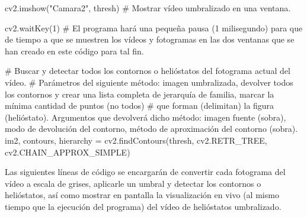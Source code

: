 \documentclass[12pt]{article}
\begin{document}
    cv2.imshow("Camara2", thresh) \# Mostrar vídeo umbralizado en una ventana.

    cv2.waitKey(1) \# El programa hará una pequeña pausa (1 milisegundo) para que de tiempo a que se muestren los vídeos y fotogramas en las dos ventanas que se han creado en este código para tal fin.

    \# Buscar y detectar todos los contornos o helióstatos del fotograma actual del vídeo.
    \# Parámetros del siguiente método: imagen umbralizada, devolver todos los contornos y crear una lista completa de jerarquía de familia, marcar la mínima cantidad de puntos (no todos)
    \# que forman (delimitan) la figura (helióstato). Argumentos que devolverá dicho método: imagen fuente (sobra), modo de devolución del contorno, método de aproximación del contorno (sobra).
    im2, contours, hierarchy = cv2.findContours(thresh, cv2.RETR\_TREE, cv2.CHAIN\_APPROX\_SIMPLE)

Las siguientes líneas de código se encargarán de convertir cada fotograma del vídeo a escala de grises, aplicarle un umbral y detectar los contornos o helióstatos, así como mostrar en pantalla la visualización en vivo (al mismo tiempo que la ejecución del programa) del vídeo de helióstatos umbralizado.
\end{document}

